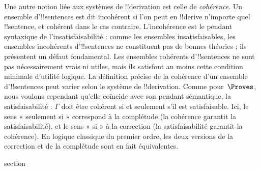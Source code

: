\documentclass[11pt,a4paper,openany]{memoir}
\begin{document}
Une autre notion liée aux systèmes de !!{derivation} est celle de
\emph{cohérence}. Un ensemble d'!!{sentence}s est dit incohérent si
l'on peut en !!{derive} n'importe quel !!{sentence}, et cohérent dans
le cas contraire. L'incohérence est le pendant syntaxique de
l'insatisfaisabilité : comme les ensembles insatisfaisables, les
ensembles incohérents d'!!{sentence}s ne constituent pas de bonnes
théories ; ils présentent un défaut fondamental. Les ensembles cohérents
d'!!{sentence}s ne sont pas nécessairement vrais ni utiles, mais ils
satisfont au moins cette condition minimale d'utilité logique. La
définition précise de la cohérence d'un ensemble d'!!{sentence}s peut
varier selon le système de !!{derivation}. Comme pour~$\Proves$, nous
voulons cependant qu'elle coïncide avec son pendant sémantique, la
satisfaisabilité : $\Gamma$ doit être cohérent si et seulement s'il est
satisfaisable. Ici, le sens « seulement si » correspond à la complétude
(la cohérence garantit la satisfaisabilité), et le sens « si » à la
correction (la satisfaisabilité garantit la cohérence). En logique
classique du premier ordre, les deux versions de la correction et de
la complétude sont en fait équivalentes.


\endgroup



\begingroup
\expandafter\def\csname ol@sectioncs\endcsname{section}
\def\olfilename{sequent-calculus}


      {}
      {}

\end{document}
